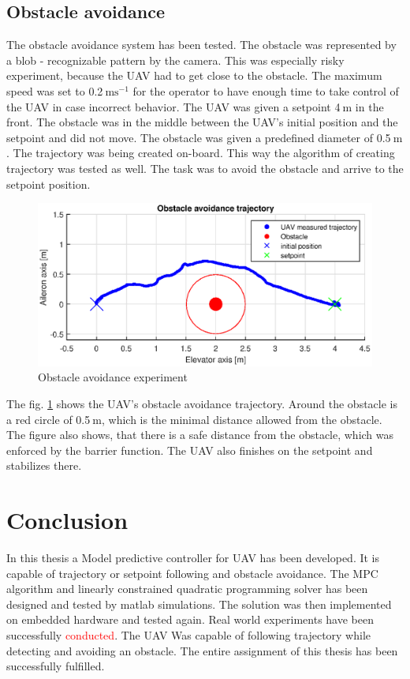 \documentclass[a4paper,11pt,titlepage]{article}
\newcommand{\jed}[1]{\ensuremath{~\mathrm{#1}}}
\begin{document}
\subsection{Obstacle avoidance}
The obstacle avoidance system has been tested. The obstacle was represented by a blob - recognizable pattern by the camera. This was especially risky experiment, because the UAV had to get close to the obstacle. The maximum speed was set to 0.2\jed{ms^{-1}} for the operator to have enough time to take control of the UAV in case incorrect behavior. The UAV was given a setpoint 4\jed{m} in the front. The obstacle was in the middle between the UAV's initial position and the setpoint and did not move. The obstacle was given a predefined diameter of 0.5\jed{m}. The trajectory was being created on-board. This way the algorithm of creating trajectory was tested as well. The task was to avoid the obstacle and arrive to the setpoint position.

\begin{figure}[h]
\centering
\includegraphics[width=1\textwidth]{fig/avoidance_experiment.eps}
\caption{Obstacle avoidance experiment}
\label{fig:avoidance_experiment}
\end{figure}

The fig. \ref{fig:avoidance_experiment} shows the UAV's obstacle avoidance trajectory. Around the obstacle is a red circle of 0.5\jed{m}, which is the minimal distance allowed from the obstacle. The figure also shows, that there is a safe distance from the obstacle, which was enforced by the barrier function. The UAV also finishes on the setpoint and stabilizes there.

\section{Conclusion}
In this thesis a Model predictive controller for UAV has been developed. It is capable of trajectory or setpoint following and obstacle avoidance. The MPC algorithm and linearly constrained quadratic programming solver has been designed and tested by matlab simulations. The solution was then implemented on embedded hardware and tested again. Real world experiments have been successfully \textcolor{red}{conducted}. The UAV Was capable of following trajectory while detecting and avoiding an obstacle. The entire assignment of this thesis has been successfully fulfilled.
\end{document}
